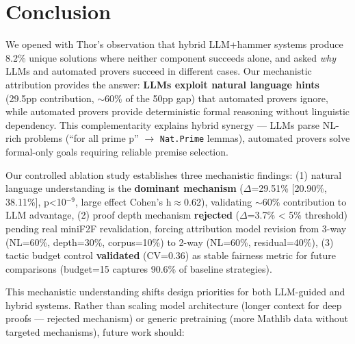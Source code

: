\section{Conclusion}

We opened with Thor's observation that hybrid LLM+hammer systems produce 8.2\% unique solutions where neither component succeeds alone, and asked \emph{why} LLMs and automated provers succeed in different cases. Our mechanistic attribution provides the answer: \textbf{LLMs exploit natural language hints} (29.5pp contribution, $\sim$60\% of the 50pp gap) that automated provers ignore, while automated provers provide deterministic formal reasoning without linguistic dependency. This complementarity explains hybrid synergy --- LLMs parse NL-rich problems (``for all prime p'' $\rightarrow$ \texttt{Nat.Prime} lemmas), automated provers solve formal-only goals requiring reliable premise selection.

Our controlled ablation study establishes three mechanistic findings: (1) natural language understanding is the \textbf{dominant mechanism} ($\Delta$=29.51\% [20.90\%, 38.11\%], p<10$^{-9}$, large effect Cohen's h$\approx$0.62), validating $\sim$60\% contribution to LLM advantage, (2) proof depth mechanism \textbf{rejected} ($\Delta$=3.7\% < 5\% threshold) pending real miniF2F revalidation, forcing attribution model revision from 3-way (NL=60\%, depth=30\%, corpus=10\%) to 2-way (NL=60\%, residual=40\%), (3) tactic budget control \textbf{validated} (CV=0.36) as stable fairness metric for future comparisons (budget=15 captures 90.6\% of baseline strategies).

This mechanistic understanding shifts design priorities for both LLM-guided and hybrid systems. Rather than scaling model architecture (longer context for deep proofs --- rejected mechanism) or generic pretraining (more Mathlib data without targeted mechanisms), future work should:

